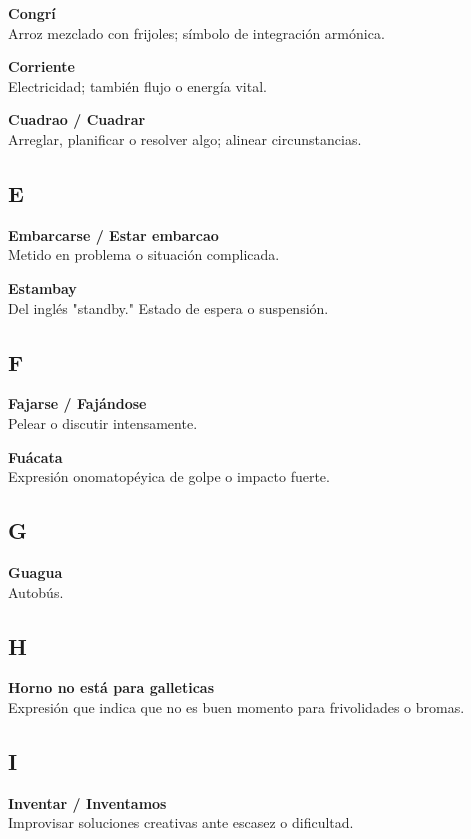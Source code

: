 \documentclass[12pt]{article}
\begin{document}
\textbf{Congrí}\\
Arroz mezclado con frijoles; símbolo de integración armónica.

\textbf{Corriente}\\
Electricidad; también flujo o energía vital.

\textbf{Cuadrao / Cuadrar}\\
Arreglar, planificar o resolver algo; alinear circunstancias.

\subsection*{E}

\textbf{Embarcarse / Estar embarcao}\\
Metido en problema o situación complicada.

\textbf{Estambay}\\
Del inglés "standby." Estado de espera o suspensión.

\subsection*{F}

\textbf{Fajarse / Fajándose}\\
Pelear o discutir intensamente.

\textbf{Fuácata}\\
Expresión onomatopéyica de golpe o impacto fuerte.

\subsection*{G}

\textbf{Guagua}\\
Autobús.

\subsection*{H}

\textbf{Horno no está para galleticas}\\
Expresión que indica que no es buen momento para frivolidades o bromas.

\subsection*{I}

\textbf{Inventar / Inventamos}\\
Improvisar soluciones creativas ante escasez o dificultad.
\end{document}
